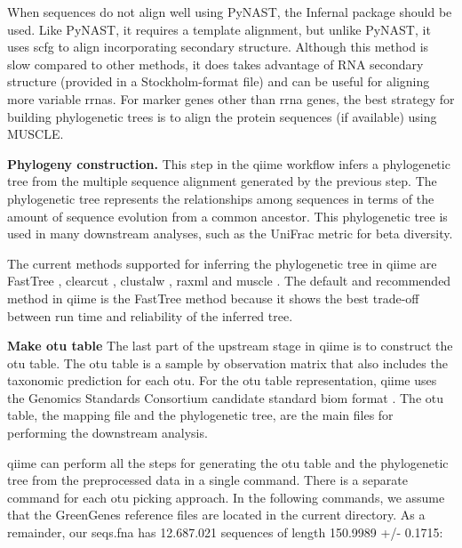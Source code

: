 When sequences do not align well using PyNAST, the Infernal package \cite{Nawrocki2009}
should be used. Like PyNAST, it requires a template alignment, but unlike PyNAST, it uses
\gls{scfg} to align incorporating secondary structure. Although this method is slow compared
to other methods, it does takes advantage of RNA secondary structure (provided in a
Stockholm-format file) and can be useful for aligning more variable \gls{rrna}s. For marker
genes other than \gls{rrna} genes, the best strategy for building phylogenetic trees is to align
the protein sequences (if available) using MUSCLE.

\textbf{Phylogeny construction.} This step in the \gls{qiime} workflow infers a
phylogenetic tree from the multiple sequence alignment generated by the previous step.
The phylogenetic tree represents the relationships among sequences in terms of the
amount of sequence evolution from a common ancestor. This phylogenetic tree is used
in many downstream analyses, such as the UniFrac metric \cite{Lozupone2005} for beta diversity.

The current methods supported for inferring the phylogenetic tree in \gls{qiime} are
FastTree \cite{Price2009}, clearcut \cite{Evans2006}, clustalw \cite{Larkin2007},
raxml \cite{Stamatakis2005} and muscle \cite{Edgar2004}. The default and recommended
method in \gls{qiime} is the FastTree \cite{Price2009} method because it shows the
best trade-off between run time and reliability of the inferred tree.

\textbf{Make \gls{otu} table} The last part of the upstream stage in \gls{qiime} is to
construct the \gls{otu} table. The \gls{otu} table is a sample by observation matrix
that also includes the taxonomic prediction for each \gls{otu}. For the \gls{otu} table
representation, \gls{qiime} uses the Genomics Standards Consortium candidate standard \gls{biom}
format \cite{McDonald2012BIOM}. The \gls{otu} table, the mapping file and the phylogenetic
tree, are the main files for performing the downstream analysis.

\gls{qiime} can perform all the steps for generating the \gls{otu} table and the
phylogenetic tree from the preprocessed data in a single command. There is a separate
command for each \gls{otu} picking approach. In the following commands, we assume that
the GreenGenes reference files \cite{DeSantis2006} are located in the current directory.
As a remainder, our seqs.fna has 12.687.021 sequences of length 150.9989 +/- 0.1715:

